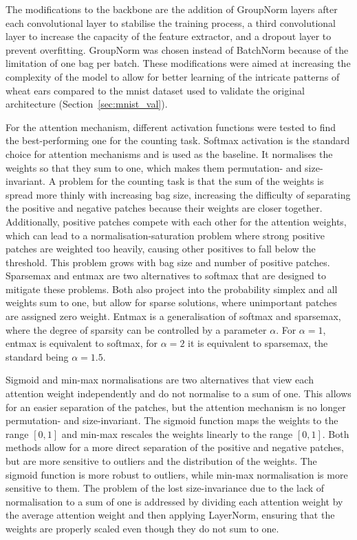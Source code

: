 \documentclass[12pt,parskip = half, DIV=classic,listof=totoc]{scrartcl}
\begin{document}
				The modifications to the backbone are the addition of GroupNorm layers after each convolutional layer to stabilise the 
				training process, a third convolutional layer to increase the capacity of the feature extractor, and a dropout layer 
				to prevent overfitting. GroupNorm was chosen instead of BatchNorm because of the limitation of one bag per batch. These 
				modifications were aimed at increasing the complexity of the model to allow for better learning of the intricate
				patterns of wheat ears compared to the \ac{mnist} dataset used to validate the original architecture (Section~\ref{sec:mnist_val}).

				For the attention mechanism, different activation functions were tested to find the best-performing one for the counting task.				
				Softmax activation is the standard choice for attention mechanisms and is used as the baseline. It normalises the weights 
				so that they sum to one, which makes them permutation- and size-invariant. A problem for the counting task is that the sum of the weights
				is spread more thinly with increasing bag size, increasing the difficulty of separating the positive and negative patches 
				because their weights are closer together. Additionally, positive patches compete with each other for the attention weights,
				which can lead to a normalisation-saturation problem where strong positive patches are weighted too heavily, causing other positives to fall below the threshold.
				This problem grows with bag size and number of positive patches. Sparsemax \cite{sparsemax} and entmax \cite{entmax} are two alternatives to softmax
				that are designed to mitigate these problems. Both also project into the probability simplex and all weights sum to one,
				but allow for sparse solutions, where unimportant patches are assigned zero weight. Entmax is a generalisation of softmax and sparsemax,
				where the degree of sparsity can be controlled by a parameter $\alpha$. For $\alpha=1$, entmax is equivalent to softmax, for $\alpha=2$ 
				it is equivalent to sparsemax, the standard being $\alpha=1.5$. 

				Sigmoid and min-max normalisations are two alternatives that view each attention weight independently and do not normalise to a sum of one.
				This allows for an easier separation of the patches, but the attention mechanism is no longer permutation- and size-invariant. 
				The sigmoid function maps the weights to the range $[0,1]$ and min-max rescales the weights linearly to the range $[0,1]$. 
				Both methods allow for a more direct separation of the positive and negative patches, but are more sensitive to outliers and the distribution of the weights. 
				The sigmoid function is more robust to outliers, while min-max normalisation is more sensitive to them. 
				The problem of the lost size-invariance due to the lack of normalisation to a sum of one is addressed by dividing each attention weight
				by the average attention weight and then applying LayerNorm, ensuring that the weights are properly scaled even though they do not sum to one.
\end{document}

